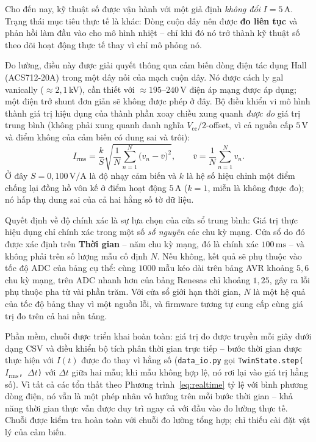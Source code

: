 \documentclass[a4paper, 10pt, conference]{ieeeconf}
\theoremstyle{remark}
\begin{document}
Cho đến nay, kỹ thuật số được vận hành với một giả định \emph{không đổi}
$I=5\,\mathrm A$. Trạng thái mục tiêu thực tế là khác: Dòng cuộn dây nên được
\textbf{đo liên tục} và phản hồi làm đầu vào cho mô hình nhiệt -- chỉ khi đó nó
trở thành kỹ thuật số theo dõi hoạt động thực tế thay vì chỉ mô phỏng nó.

Đo lường, điều này được giải quyết thông qua cảm biến dòng điện tác dụng Hall
(ACS712-20A) trong một dây nối của mạch cuộn dây. Nó được cách ly gal vanically
($\approx2{,}1$\,kV), cần thiết với $\approx195$--$240\,\mathrm V$ điện áp mạng
được áp dụng; một điện trở shunt đơn giản sẽ không được phép ở đây. Bộ điều khiển
vi mô hình thành giá trị hiệu dụng của thành phần xoay chiều xung quanh
\emph{được đo} giá trị trung bình (không phải xung quanh danh nghĩa $V_{\mathrm{cc}}/2$-offset,
vì cả nguồn cấp $5\,\mathrm V$ và điểm không của cảm biến có dung sai và trôi):
\begin{equation}
  I_{\mathrm{rms}} = \frac{k}{S}\sqrt{\frac{1}{N}\sum_{n=1}^{N}
      \bigl(v_n - \bar v\bigr)^2},
  \qquad \bar v = \frac{1}{N}\sum_{n=1}^{N} v_n .
  \label{eq:irms}
\end{equation}
Ở đây $S=0{,}100\,\mathrm{V/A}$ là độ nhạy cảm biến và $k$ là hệ số hiệu chỉnh
một điểm chống lại đồng hồ vôn kế ở điểm hoạt động $5\,\mathrm A$ ($k=1$, miễn là
không được đo); nó hấp thụ dung sai của cả hai hằng số tờ dữ liệu.

Quyết định về độ chính xác là sự lựa chọn của cửa sổ trung bình: Giá trị thực hiệu
dụng chỉ chính xác trong một số \emph{số nguyên} các chu kỳ mạng. Cửa sổ do đó được
xác định trên \textbf{Thời gian} -- năm chu kỳ mạng, đó là chính xác $100\,\mathrm{ms}$ --
và không phải trên số lượng mẫu cố định $N$. Nếu không, kết quả sẽ phụ thuộc vào tốc
độ ADC của bảng cụ thể: cùng $1000$ mẫu kéo dài trên bảng AVR khoảng $5{,}6$ chu kỳ
mạng, trên ADC nhanh hơn của bảng Renesas chỉ khoảng $1{,}25$, gây ra lỗi phụ thuộc
pha từ vài phần trăm. Với cửa sổ giới hạn thời gian, $N$ là một hệ quả của tốc độ
bảng thay vì một nguồn lỗi, và firmware tương tự cung cấp cùng giá trị đo trên cả
hai nền tảng.

Phần mềm, chuỗi được triển khai hoàn toàn: giá trị đo được truyền mỗi giây dưới
dạng CSV và điều khiển bộ tích phân thời gian trực tiếp -- bước thời gian được
thực hiện với $I(t)$ được đo thay vì hằng số (\texttt{data\_io.py} gọi
\texttt{TwinState.step(}$I_{\mathrm{rms}}$\texttt{,}~$\Delta t$\texttt{)} với
$\Delta t$ giữa hai mẫu; khi mẫu không hợp lệ, nó rơi lại vào giá trị hằng số). Vì
tất cả các tổn thất theo Phương trình~\eqref{eq:realtime} tỷ lệ với bình phương
dòng điện, nó vẫn là một phép nhân vô hướng trên mỗi bước thời gian -- khả năng
thời gian thực vẫn được duy trì ngay cả với đầu vào đo lường thực tế. Chuỗi được
kiểm tra hoàn toàn với chuỗi đo lường tổng hợp; chỉ thiếu cài đặt vật lý của cảm
biến.
\end{document}
